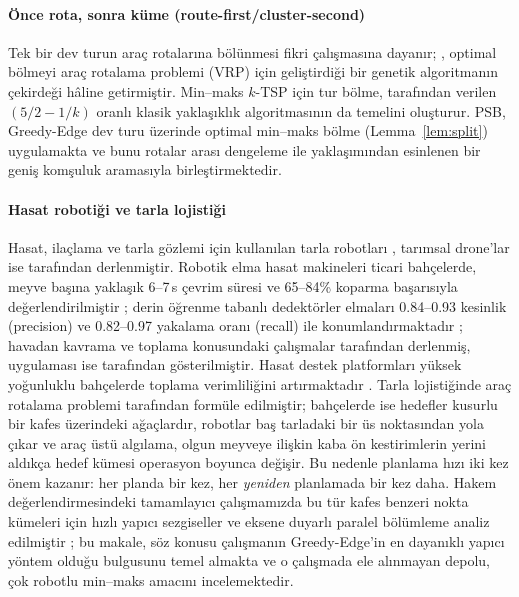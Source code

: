 \paragraph{Önce rota, sonra küme (route-first/cluster-second)} Tek bir dev turun araç
rotalarına bölünmesi fikri \citet{beasley1983} çalışmasına dayanır; \citet{prins2004},
optimal bölmeyi araç rotalama problemi (VRP) için geliştirdiği bir genetik algoritmanın çekirdeği hâline getirmiştir. Min--maks
$k$-TSP için tur bölme, \citet{frederickson1978} tarafından verilen
$(5/2-1/k)$ oranlı klasik yaklaşıklık algoritmasının da temelini oluşturur.
PSB, Greedy-Edge dev turu \citep{bentley1992} üzerinde optimal min--maks bölme
(Lemma~\ref{lem:split}) uygulamakta ve bunu rotalar arası dengeleme ile
\citet{shaw1998} yaklaşımından esinlenen bir geniş komşuluk aramasıyla birleştirmektedir.

\paragraph{Hasat robotiği ve tarla lojistiği} Hasat, ilaçlama ve tarla gözlemi için kullanılan tarla robotları
\citet{bechar2016}, tarımsal drone'lar ise \citet{rejeb_2022_drones} tarafından
derlenmiştir. Robotik elma
hasat makineleri ticari bahçelerde, meyve başına yaklaşık 6--7\,s çevrim süresi
ve 65--84\% koparma başarısıyla değerlendirilmiştir \citep{silwal_2017_design,
hohimer_2019_design,zhang_2024_automated,zhu_2025_advancement}; derin öğrenme tabanlı
dedektörler elmaları 0.84--0.93 kesinlik (precision) ve
0.82--0.97 yakalama oranı (recall) ile konumlandırmaktadır \citep{kang_2020_fast,sapkota_2024_comparing}; havadan kavrama ve toplama
konusundaki çalışmalar \citet{ruggiero_2018_aerial} tarafından derlenmiş, uygulaması ise
\citet{kumar_2024_design} tarafından gösterilmiştir. Hasat destek platformları yüksek yoğunluklu bahçelerde
toplama verimliliğini artırmaktadır \citep{baugher_2009_mobile,zhang_2016_design}. Tarla lojistiğinde
araç rotalama problemi \citet{bochtis2009} tarafından formüle edilmiştir;
bahçelerde ise hedefler kusurlu bir kafes üzerindeki ağaçlardır, robotlar baş tarladaki bir
üs noktasından yola çıkar ve araç üstü algılama, olgun meyveye ilişkin kaba ön kestirimlerin yerini aldıkça
hedef kümesi operasyon boyunca değişir. Bu nedenle planlama hızı iki kez
önem kazanır: her planda bir kez, her \emph{yeniden} planlamada bir kez daha. Hakem değerlendirmesindeki tamamlayıcı çalışmamızda bu tür kafes benzeri nokta kümeleri için hızlı
yapıcı sezgiseller ve eksene duyarlı paralel bölümleme analiz edilmiştir \citep{asil2026frame};
bu makale, söz konusu çalışmanın Greedy-Edge'in en dayanıklı
yapıcı yöntem olduğu bulgusunu temel almakta ve o çalışmada ele alınmayan depolu, çok robotlu
min--maks amacını incelemektedir.
